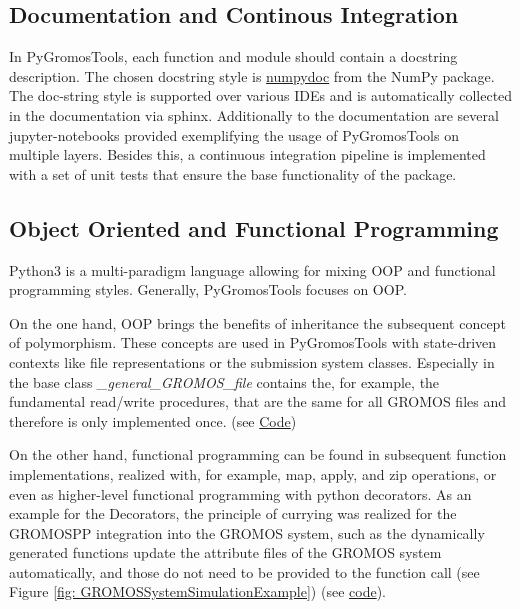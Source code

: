 \subsection{Documentation and Continous Integration}
In PyGromosTools, each function and module should contain a docstring description. The chosen docstring style is \hyperlink{https://numpydoc.readthedocs.io/en/latest/format.html}{numpydoc} from the NumPy package. \cite{VanDerWalt2011} The doc-string style is supported over various IDEs and is automatically collected in the documentation via sphinx.
Additionally to the documentation are several jupyter-notebooks provided exemplifying the usage of PyGromosTools on multiple layers. \cite{Kluyver2016}
Besides this, a continuous integration pipeline is implemented with a set of unit tests that ensure the base functionality of the package.


\subsection{Object Oriented and Functional Programming}
Python3 is a multi-paradigm language allowing for mixing OOP and functional programming styles. Generally, PyGromosTools focuses on OOP. 

On the one hand, OOP brings the benefits of inheritance the subsequent concept of polymorphism. These concepts are used in PyGromosTools with state-driven contexts like file representations or the submission system classes. Especially in the base class \textit{\_general\_GROMOS\_file} contains the, for example, the fundamental read/write procedures, that are the same for all GROMOS files and therefore is only implemented once. (see \hyperlink{https://github.com/rinikerlab/PyGromosTools/blob/348439a326357b8172717f5d5ed7a5bbfa4564ab/pyGROMOS/files/\_basics/\_general\_GROMOS\_file.py\#L15}{Code})

On the other hand, functional programming can be found in subsequent function implementations, realized with, for example, map, apply, and zip operations, or even as higher-level functional programming with python decorators. As an example for the Decorators, the principle of currying was realized for the GROMOSPP integration into the GROMOS system, such as the dynamically generated functions update the attribute files of the GROMOS system automatically, and those do not need to be provided to the function call (see Figure \ref{fig: GROMOSSystemSimulationExample}) (see  \hyperlink{https://github.com/rinikerlab/PyGromosTools/blob/348439a326357b8172717f5d5ed7a5bbfa4564ab/pyGROMOS/files/GROMOS\_system/GROMOS\_system.py\#L915}{code}). \cite{Curry1958}


